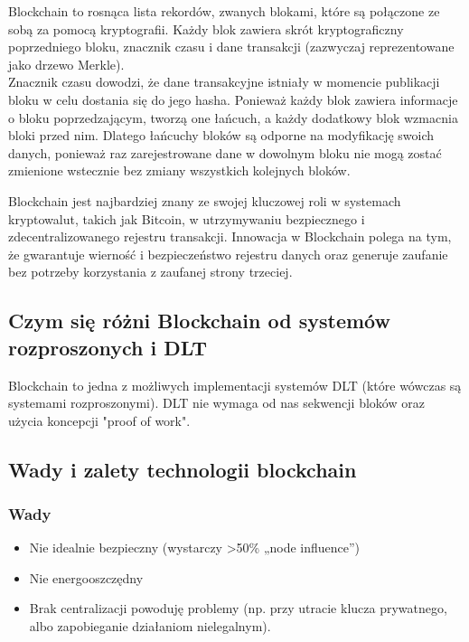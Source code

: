 \documentclass[12pt]{article}
\begin{document}
Blockchain to rosnąca lista rekordów, zwanych blokami, które są połączone ze sobą za pomocą kryptografii. Każdy blok zawiera skrót kryptograficzny poprzedniego bloku, znacznik czasu i dane transakcji (zazwyczaj reprezentowane jako drzewo Merkle). \\
Znacznik czasu dowodzi, że dane transakcyjne istniały w momencie publikacji bloku w celu dostania się do jego hasha. Ponieważ każdy blok zawiera informacje o bloku poprzedzającym, tworzą one łańcuch, a każdy dodatkowy blok wzmacnia bloki przed nim. Dlatego łańcuchy bloków są odporne na modyfikację swoich danych, ponieważ raz zarejestrowane dane w dowolnym bloku nie mogą zostać zmienione wstecznie bez zmiany wszystkich kolejnych bloków. \cite{wiki-blockchain}

Blockchain jest najbardziej znany ze swojej kluczowej roli w systemach kryptowalut, takich jak Bitcoin, w utrzymywaniu bezpiecznego i zdecentralizowanego rejestru transakcji. Innowacja w Blockchain polega na tym, że gwarantuje wierność i bezpieczeństwo rejestru danych oraz generuje zaufanie bez potrzeby korzystania z zaufanej strony trzeciej.



\subsection{Czym się różni Blockchain od systemów rozproszonych i DLT}

Blockchain to jedna z możliwych implementacji systemów DLT (które wówczas są systemami rozproszonymi). DLT nie wymaga od nas sekwencji bloków oraz użycia koncepcji "proof of work".

\subsection{Wady i zalety technologii blockchain}

\subsubsection{Wady}
\begin{itemize}
  \item Nie idealnie bezpieczny (wystarczy >50\% „node influence”)
  \item Nie energooszczędny
  \item Brak centralizacji powoduję problemy (np. przy utracie klucza prywatnego, albo zapobieganie działaniom nielegalnym).
\end{itemize}
\end{document}
